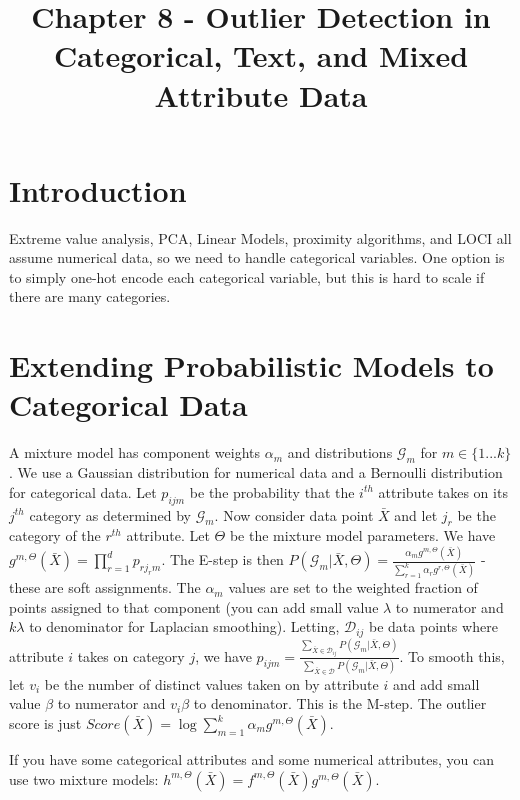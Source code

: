 \documentclass[a4paper]{article}
\title{Chapter 8 - Outlier Detection in Categorical, Text, and Mixed Attribute Data}
\date{}
\begin{document}
\maketitle

\section{Introduction}
Extreme value analysis, PCA, Linear Models, proximity algorithms, and LOCI all
assume numerical data, so we need to handle categorical variables. One option
is to simply one-hot encode each categorical variable, but this is hard to scale
if there are many categories.

\section{Extending Probabilistic Models to Categorical Data}
A mixture model has component weights $\alpha_m$ and distributions
$\mathcal{G}_m$ for $m \in \{1...k\}$. We use a Gaussian distribution for
numerical data and a Bernoulli distribution for categorical data. Let $p_{ijm}$
be the probability that the $i^{th}$ attribute takes on its $j^{th}$ category
as determined by $\mathcal{G}_m$. Now consider data point $\bar{X}$ and let
$j_r$ be the category of the $r^{th}$ attribute. Let $\Theta$ be the mixture
model parameters. We have
$g^{m, \Theta}(\bar{X}) = \prod_{r=1}^{d}{p_{r j_r m}}$. The E-step is then
$P(\mathcal{G}_m | \bar{X}, \Theta) = \frac{\alpha_m g^{m, \Theta}(\bar{X})}{
\sum_{r=1}^{k}{\alpha_r g^{r, \Theta}(\bar{X})}}$ - these are soft assignments.
The $\alpha_m$ values are set to the weighted fraction of points assigned to
that component (you can add small value $\lambda$ to numerator and
$k \lambda$ to denominator for Laplacian smoothing). Letting, $\mathcal{D}_{ij}$
be data points where attribute $i$ takes on category $j$, we have
$p_{ijm} = \frac{\sum_{\bar{X} \in \mathcal{D}_{ij}}{P(\mathcal{G}_m | \bar{X},
\Theta)}}{\sum_{\bar{X} \in \mathcal{D}}{P(\mathcal{G}_m | \bar{X},
\Theta)}}$. To smooth this, let $v_i$ be the number of distinct values taken on
by attribute $i$ and add small value $\beta$ to numerator and $v_i \beta$ to
denominator. This is the M-step. The outlier score is just $Score(\bar{X})
= \log{\sum_{m=1}^{k}{\alpha_m g^{m, \Theta}(\bar{X})}}$.

If you have some categorical attributes and some numerical attributes, you can
use two mixture models: $h^{m, \Theta}(\bar{X}) = f^{m, \Theta}(\bar{X})
g^{m, \Theta}(\bar{X})$.
\end{document}
